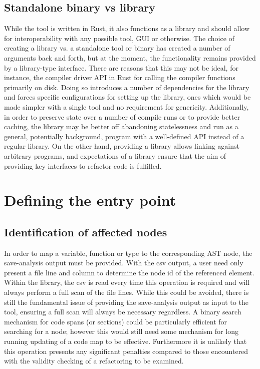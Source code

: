 \subsection{Standalone binary vs library}
While the tool is written in Rust, it also functions as a library and should allow for interoperability with any possible tool, GUI or otherwise. The choice of creating a library vs. a standalone tool or binary has created a number of arguments back and forth, but at the moment, the functionality remains provided by a library-type interface. There are reasons that this may not be ideal, for instance, the compiler driver API in Rust for calling the compiler functions primarily on disk. Doing so introduces a number of dependencies for the library and forces specific configurations for setting up the library, ones which would be made simpler with a single tool and no requirement for genericity. Additionally, in order to preserve state over a number of compile runs or to provide better caching, the library may be better off abandoning statelessness and run as a general, potentially background, program with a well-defined API instead of a regular library. On the other hand, providing a library allows linking against arbitrary programs, and expectations of a library ensure that the aim of providing key interfaces to refactor code is fulfilled.


\section{Defining the entry point}\label{S:entry}
\subsection{Identification of affected nodes}
In order to map a variable, function or type to the corresponding AST node, the save-analysis output must be provided. With the csv output, a user need only present a file line and column to determine the node id of the referenced element. Within the library, the csv is read every time this operation is required and will always perform a full scan of the file lines. While this could be avoided, there is still the fundamental issue of providing the save-analysis output as input to the tool, ensuring a full scan will always be necessary regardless. A binary search mechanism for code spans (or sections) could be particularly efficient for searching for a node; however this would still need some mechanism for long running updating of a code map to be effective. Furthermore it is unlikely that this operation presents any significant penalties compared to those encountered with the validity checking of a refactoring to be examined.

